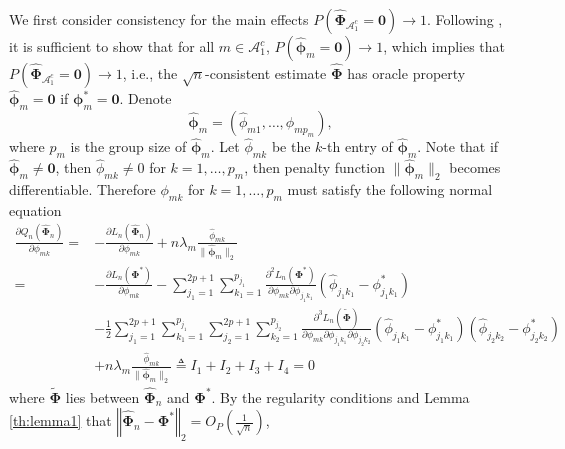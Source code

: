\documentclass[a4paper,fleqn]{cas-sc}
\newcommand{\Op}{O_{P}}
\newcommand{\ddd}{,\ldots,}
\newcommand{\A}{\mathcal{A}}
\begin{document}
{\normalsize{}We first consider consistency for the main effects
	$P\left(\widehat{\boldsymbol{\Phi}}_{\mathcal{\A}_{1}^{c}}=\mathbf{0}\right)\rightarrow1$.
	Following \citep{fan2001variable,choi2010variable}, it is sufficient
	to show that for all $m\in\A_{1}^{c}$, $P\left(\widehat{\boldsymbol{\phi}}_{m}=\mathbf{0}\right)\rightarrow1$,
	which implies that $P\left(\widehat{\boldsymbol{\Phi}}_{\mathcal{\A}_{1}^{c}}=\mathbf{0}\right)\rightarrow1$,
	i.e., the $\sqrt{n}$-consistent estimate $\widehat{\boldsymbol{\Phi}}$
	has oracle property $\widehat{\boldsymbol{\phi}}_{m}=\mathbf{0}$
	if $\boldsymbol{\phi}_{m}^{*}=\mathbf{0}$. Denote 
	\[
	\widehat{\boldsymbol{\phi}}_{m}=(\hat{\phi}_{m1}\ddd\hat{\phi}_{mp_{m}}),
	\]
	where $p_{m}$ is the group size of $\widehat{\boldsymbol{\phi}}_{m}$.
	Let $\hat{\phi}_{mk}$ be the $k$-th entry of $\widehat{\boldsymbol{\phi}}_{m}$.
	Note that if $\widehat{\boldsymbol{\phi}}_{m}\neq\mathbf{0}$, then
	$\hat{\phi}_{mk}\neq0$ for $k=1\ddd p_{m}$, then penalty function
	$\|\widehat{\boldsymbol{\phi}}_{m}\|_{2}$ becomes differentiable.
	Therefore $\phi_{mk}$ for $k=1\ddd p_{m}$ must satisfy the following
	normal equation
	\begin{align*}
	\frac{\partial Q_{n}\left(\widehat{\boldsymbol{\Phi}}_{n}\right)}{\partial\phi_{mk}}= & -\frac{\partial L_{n}\left(\widehat{\boldsymbol{\Phi}}_{n}\right)}{\partial\phi_{mk}}+n\lambda_{m}\frac{\hat{\phi}_{mk}}{\|\widehat{\boldsymbol{\phi}}_{m}\|_{2}}\\
	= & -\frac{\partial L_{n}\left(\boldsymbol{\Phi}^{*}\right)}{\partial\phi_{mk}}-\sum_{j_{1}=1}^{2p+1}\sum_{k_{1}=1}^{p_{j_{1}}}\frac{\partial^{2}L_{n}\left(\boldsymbol{\Phi}^{*}\right)}{\partial\phi_{mk}\partial\phi_{j_{1}k_{1}}}\left(\hat{\phi}_{j_{1}k_{1}}-\phi_{j_{1}k_{1}}^{*}\right)\\
	& -\frac{1}{2}\sum_{j_{1}=1}^{2p+1}\sum_{k_{1}=1}^{p_{j_{1}}}\sum_{j_{2}=1}^{2p+1}\sum_{k_{2}=1}^{p_{j_{2}}}\frac{\partial^{3}L_{n}(\widetilde{\boldsymbol{\Phi}})}{\partial\phi_{mk}\partial\phi_{j_{1}k_{1}}\partial\phi_{j_{2}k_{2}}}\left(\hat{\phi}_{j_{1}k_{1}}-\phi_{j_{1}k_{1}}^{*}\right)\left(\hat{\phi}_{j_{2}k_{2}}-\phi_{j_{2}k_{2}}^{*}\right)\\
	& +n\lambda_{m}\frac{\hat{\phi}_{mk}}{\|\widehat{\boldsymbol{\phi}}_{m}\|_{2}}\triangleq I_{1}+I_{2}+I_{3}+I_{4}=0
	\end{align*}
	where $\widetilde{\boldsymbol{\Phi}}$ lies between $\widehat{\boldsymbol{\Phi}}_{n}$
	and $\boldsymbol{\Phi}^{*}$. By the regularity conditions and Lemma
	\eqref{th:lemma1} that $\left\Vert \widehat{\boldsymbol{\Phi}}_{n}-\boldsymbol{\Phi}^{*}\right\Vert _{2}=\Op\left(\frac{1}{\sqrt{n}}\right)$,
}
\end{document}
